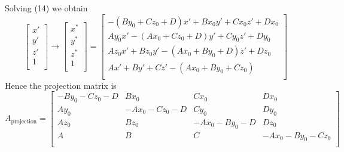 \documentclass[11pt]{article}
\begin{document}
Solving (14) we obtain
\begin{equation}
    \begin{bmatrix}
    x' \\ y' \\ z' \\ 1 \\
    \end{bmatrix} \rightarrow \begin{bmatrix}
    x^*\\y^*\\z^*\\1\\
    \end{bmatrix} =
    \begin{bmatrix}
    -(By_0+Cz_0+D)x' +Bx_0y' +Cx_0z'+Dx_0 \\
    Ay_0x'-(Ax_0+Cz_0+D)y'+Cy_0z'+Dy_0\\
    Az_0x'+Bz_0y'-(Ax_0+By_0+D)z'+Dz_0\\
    Ax'+By'+Cz'-(Ax_0+By_0+Cz_0)\\
    \end{bmatrix}
\end{equation}
Hence the projection matrix is
\begin{equation}
    A_{\text{projection}} = \begin{bmatrix}
    -By_0-Cz_0-D & Bx_0 & Cx_0 & Dx_0 \\
    Ay_0 & -Ax_0 - Cz_0 - D & Cy_0 & Dy_0 \\
    Az_0 & Bz_0 & -Ax_0 -By_0 - D & Dz_0 \\
    A & B & C & -Ax_0 - By_0 - Cz_0 \\
    \end{bmatrix}
\end{equation}
\end{document}

